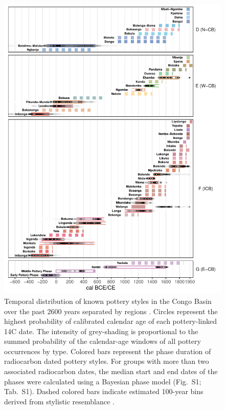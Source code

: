\documentclass[smallextended,natbib]{svjour3}       %
\begin{document}
\begin{figure}[!tbp]
\centering
\includegraphics[width=\textwidth]{fig_chronology.pdf}
\caption{Temporal distribution of known pottery styles in the Congo Basin over the past 2600 years separated by regions \citep[Fig. 1; D) Northern Congo Basin, E) Western Congo Basin, F) Inner Congo Basin, G) North-Eastern Congo Basin]{Seidensticker.2021}. Circles represent the highest probability of calibrated calendar age of each pottery-linked 14C date. The intensity of grey-shading is proportional to the summed probability of the calendar-age windows of all pottery occurrences by type. Colored bars represent the phase duration of radiocarbon dated pottery styles. For groups with more than two associated radiocarbon dates, the median start and end dates of the phases were calculated using a Bayesian phase model (Fig.~S1; Tab.~S1). Dashed colored bars indicate estimated 100-year bins derived from stylistic resemblance \citep[Data S2]{Seidensticker.2021}.}
\label{fig:chrono}
\end{figure}
\end{document}
